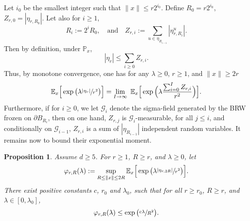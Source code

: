 \documentclass[11pt]{article}
\numberwithin{equation}{section}
\theoremstyle{plain}
\newtheorem{proposition}[theorem]{Proposition}
\theoremstyle{definition}
\newcommand{\1}{{\text{\Large $\mathfrak 1$}}}
\begin{document}
Let $i_0$ be the smallest integer such that $\|x\|\le r2^{i_0}$.
Define $R_0 = r2^{i_0}$, $Z_{r,0}=|\eta_{r,R_0}|$. Let also for $i\ge 1$,
\begin{equation}\label{def-R}
R_i := 2^{i}R_0,\quad\text{and}\quad
Z_{r,i}:= \sum_{u\in \eta_{R_{i-1}} } |\eta^u_{r,R_i}|.
\end{equation}
Then by definition, under $\mathbb P_x$,
\begin{equation*}
|\eta_r| \le \sum_{i\ge 0} Z_{r,i}.
\end{equation*}
Thus, by monotone convergence, one has for any $\lambda\ge 0$, $r\ge 1$,
and $\|x\|\ge 2r$
\begin{equation}\label{link.etar.etari}
\mathbb E_x \Big[\exp\big(\lambda\sfrac{|\eta_r|}{r^2}\big)\Big]
=\lim_{I\to \infty} \ \mathbb E_x\Big[\exp\Big(\lambda\frac{\sum_{i=0}^I
Z_{r,i}}{r^2}\Big)\Big].
\end{equation}
Furthermore, if for $i\ge 0$, we let $\mathcal G_i$ denote the sigma-field
generated by the BRW frozen on $\partial B_{R_i}$, then
on one hand, $Z_{r,j}$ is $\mathcal G_i$-measurable, for all $j\le i$,
and conditionally on $\mathcal G_{i-1}$, $Z_{r,i}$
is a sum of $|\eta_{R_{i-1}}|$
independent random variables.
It remains now to bound their exponential moment.

\begin{proposition}\label{prop.phi.i}
Assume $d\ge 5$. For $r\ge 1$, $R\ge r$, and $\lambda\ge 0$, let
\begin{equation*}
\varphi_{r,R}(\lambda) := \sup_{R\le \|x\|\le 2R}
\mathbb E_x\Big[\exp\big(\lambda\sfrac{|\eta_{r,2R}|}{r^2}\big)\Big].
\end{equation*}
There exist positive constants $c$, $r_0$ and $\lambda_0$, such that for all $r\ge r_0$, $R\ge r$, and $\lambda\in[0,\lambda_0]$,
\begin{equation*}%
\varphi_{r,R}(\lambda) \le \exp\big(\sfrac{c\lambda}{R^2}\big).
\end{equation*}
\end{proposition}
\end{document}
